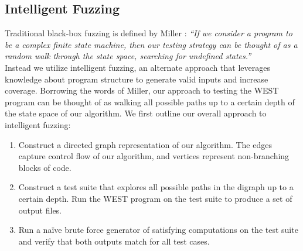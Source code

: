 \documentclass[runningheads]{llncs}
\begin{document}
\subsection{Intelligent Fuzzing}
Traditional black-box fuzzing is defined by Miller \cite{Miller}:
\textit{``If we consider a program to
be a complex finite state machine, then our testing strategy can be thought of as a random walk through the state space, searching for undefined states.''}\\
Instead we utilize intelligent fuzzing, an alternate approach that leverages knowledge about program structure to generate valid inputs and increase coverage. 
Borrowing the words of Miller, our approach to testing the WEST program can be thought of as walking all possible paths up to a certain depth of the state space of our algorithm. 
We first outline our overall approach to intelligent fuzzing: 
\begin{enumerate}
    \item Construct a directed graph representation of our algorithm.
    The edges capture control flow of our algorithm, and vertices represent non-branching blocks of code.
    \item Construct a test suite that explores all possible paths in the digraph up to a certain depth. Run the WEST program on the test suite to produce a set of output files.
    \item Run a na\"ive brute force generator of satisfying computations on the test suite and verify that both outputs match for all test cases.
\end{enumerate}
\end{document}
